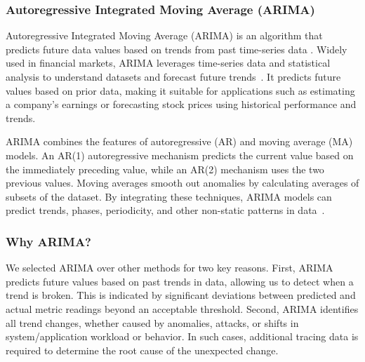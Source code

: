 \documentclass[pdflatex,sn-nature]{sn-jnl}%
\theoremstyle{thmstyleone}%
\theoremstyle{thmstyletwo}%
\theoremstyle{thmstylethree}%
\begin{document}
\subsubsection{Autoregressive Integrated Moving Average (ARIMA)}\label{methodology: autoregressive integrated moving average (arima)}

Autoregressive Integrated Moving Average (ARIMA) is an algorithm that predicts future data values based on trends from past time-series data \cite{ho1998use}. Widely used in financial markets, ARIMA leverages time-series data and statistical analysis to understand datasets and forecast future trends~\cite{qiu2019short}. It predicts future values based on prior data, making it suitable for applications such as estimating a company's earnings or forecasting stock prices using historical performance and trends.

ARIMA combines the features of autoregressive (AR) and moving average (MA) models. An AR(1) autoregressive mechanism predicts the current value based on the immediately preceding value, while an AR(2) mechanism uses the two previous values. Moving averages smooth out anomalies by calculating averages of subsets of the dataset. By integrating these techniques, ARIMA models can predict trends, phases, periodicity, and other non-static patterns in data~\cite{qiu2019short}.

\subsubsection*{Why ARIMA?}
We selected ARIMA over other methods for two key reasons. First, ARIMA predicts future values based on past trends in data, allowing us to detect when a trend is broken. This is indicated by significant deviations between predicted and actual metric readings beyond an acceptable threshold. Second, ARIMA identifies all trend changes, whether caused by anomalies, attacks, or shifts in system/application workload or behavior. In such cases, additional tracing data is required to determine the root cause of the unexpected change.
\end{document}

